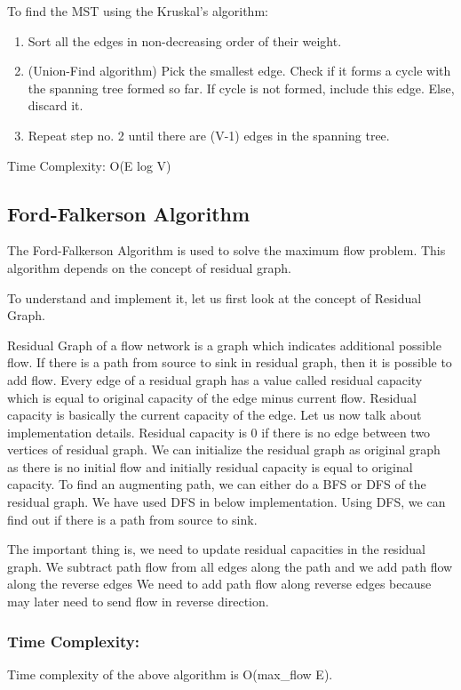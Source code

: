 \documentclass[12pt]{book}
\begin{document}
To find the MST using the Kruskal's algorithm:
\begin{enumerate}
    \item Sort all the edges in non-decreasing order of their weight.
    \item (Union-Find algorithm) Pick the smallest edge. Check if it forms a cycle with the spanning tree formed so far. If cycle is not formed, include this edge. Else, discard it.
    \item Repeat step no. 2 until there are (V-1) edges in the spanning tree.
\end{enumerate}

Time Complexity: O(E log V)

\subsection{Ford-Falkerson Algorithm}
The Ford-Falkerson Algorithm is used to solve the maximum flow problem. This algorithm depends on the concept of residual graph.

To understand and implement it, let us first look at the concept of Residual Graph.

Residual Graph of a flow network is a graph which indicates additional possible flow. If there is a path from source to sink in residual graph, then it is possible to add flow. Every edge of a residual graph has a value called residual capacity which is equal to original capacity of the edge minus current flow. Residual capacity is basically the current capacity of the edge. Let us now talk about implementation details. Residual capacity is 0 if there is no edge between two vertices of residual graph. We can initialize the residual graph as original graph as there is no initial flow and initially residual capacity is equal to original capacity. To find an augmenting path, we can either do a BFS or DFS of the residual graph. We have used DFS in below implementation. Using DFS, we can find out if there is a path from source to sink.

The important thing is, we need to update residual capacities in the residual graph. We subtract path flow from all edges along the path and we add path flow along the reverse edges We need to add path flow along reverse edges because may later need to send flow in reverse direction.

\subsubsection{Time Complexity:}
Time complexity of the above algorithm is O(max\_flow E).
\end{document}
